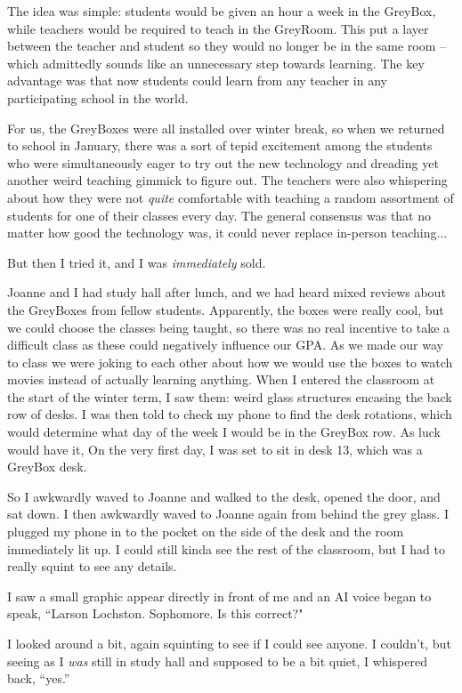 The idea was simple: students would be given an hour a week in the GreyBox, while teachers would be required to teach in the GreyRoom.
This put a layer between the teacher and student so they would no longer be in the same room -- which admittedly sounds like an unnecessary step towards learning.
The key advantage was that now students could learn from any teacher in any participating school in the world.

For us, the GreyBoxes were all installed over winter break, so when we returned to school in January, there was a sort of tepid excitement among the students who were simultaneously eager to try out the new technology and dreading yet another weird teaching gimmick to figure out.
The teachers were also whispering about how they were not \textit{quite} comfortable with teaching a random assortment of students for one of their classes every day.
The general consensus was that no matter how good the technology was, it could never replace in-person teaching...

But then I tried it, and I was \textit{immediately} sold.

Joanne and I had study hall after lunch, and we had heard mixed reviews about the GreyBoxes from fellow students.
Apparently, the boxes were really cool, but we could choose the classes being taught, so there was no real incentive to take a difficult class as these could negatively influence our GPA.
As we made our way to class we were joking to each other about how we would use the boxes to watch movies instead of actually learning anything.
When I entered the classroom at the start of the winter term, I saw them: weird glass structures encasing the back row of desks.
I was then told to check my phone to find the desk rotations, which would determine what day of the week I would be in the GreyBox row.
As luck would have it, On the very first day, I was set to sit in desk 13, which was a GreyBox desk.

So I awkwardly waved to Joanne and walked to the desk, opened the door, and sat down.
I then awkwardly waved to Joanne again from behind the grey glass.
I plugged my phone in to the pocket on the side of the desk and the room immediately lit up.
I could still kinda see the rest of the classroom, but I had to really squint to see any details.

I saw a small graphic appear directly in front of me and an AI voice began to speak, ``Larson Lochston. Sophomore. Is this correct?"

I looked around a bit, again squinting to see if I could see anyone.
I couldn't, but seeing as I \textit{was} still in study hall and supposed to be a bit quiet, I whispered back, ``yes.''

